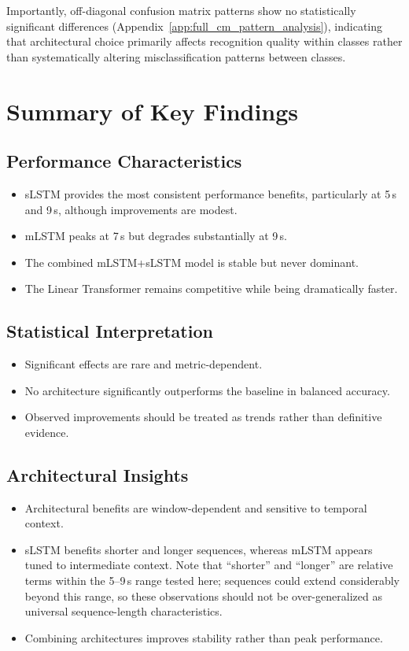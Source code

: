 Importantly, off-diagonal confusion matrix patterns show no statistically significant differences
(Appendix~\ref{app:full_cm_pattern_analysis}), indicating that architectural
choice primarily affects recognition quality within classes rather than
systematically altering misclassification patterns between classes.


\section{Summary of Key Findings}
\label{sec:key_findings}

\subsection{Performance Characteristics}

\begin{itemize}
\item \ac{sLSTM} provides the most consistent performance benefits, particularly
at 5\,s and 9\,s, although improvements are modest.
\item \ac{mLSTM} peaks at 7\,s but degrades substantially at 9\,s.
\item The combined \ac{mLSTM}+\ac{sLSTM} model is stable but never dominant.
\item The Linear Transformer remains competitive while being dramatically faster.
\end{itemize}

\subsection{Statistical Interpretation}

\begin{itemize}
\item Significant effects are rare and metric-dependent.
\item No architecture significantly outperforms the baseline in balanced accuracy.
\item Observed improvements should be treated as trends rather than definitive
evidence.
\end{itemize}

\subsection{Architectural Insights}

\begin{itemize}
\item Architectural benefits are window-dependent and sensitive to temporal context.
\item \ac{sLSTM} benefits shorter and longer sequences, whereas \ac{mLSTM}
appears tuned to intermediate context. Note that ``shorter'' and ``longer'' are
relative terms within the 5--9\,s range tested here; sequences could extend
considerably beyond this range, so these observations should not be
over-generalized as universal sequence-length characteristics.
\item Combining architectures improves stability rather than peak performance.
\end{itemize}

